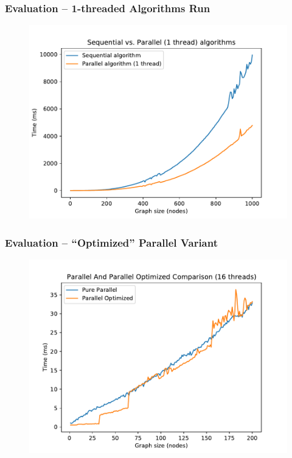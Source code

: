 \documentclass[11pt,xcolor=pdflatex]{beamer}
\begin{document}
\begin{frame}\frametitle{Evaluation -- 1-threaded Algorithms Run}

\begin{figure}
   \includegraphics[width=0.9\linewidth]{comp_1thread.pdf}
\end{figure}

\end{frame}


\begin{frame}\frametitle{Evaluation -- ``Optimized'' Parallel Variant}

\begin{figure}
   \includegraphics[width=\linewidth]{par_paropt16.pdf}
\end{figure}

\end{frame}
\end{document}
